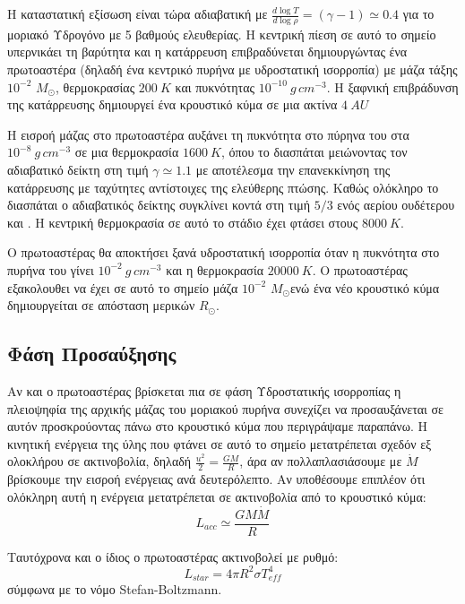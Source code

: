 \documentclass[a4paper,12pt]{memoir}
\newcommand{\sm}{$M_{\odot}$}
\begin{document}
Η καταστατική εξίσωση είναι τώρα αδιαβατική με $\frac{d \log T}{d \log \rho} = (\gamma-1) \simeq 0.4$ για το μοριακό Υδρογόνο με 5 βαθμούς ελευθερίας. Η κεντρική πίεση σε αυτό το σημείο υπερνικάει τη βαρύτητα και η κατάρρευση επιβραδύνεται δημιουργώντας ένα πρωτοαστέρα (δηλαδή ένα κεντρικό πυρήνα με υδροστατική ισορροπία) με μάζα τάξης $10^{-2}$ \sm, θερμοκρασίας $200 \ K$ και πυκνότητας $10^{-10} \ g \, cm^{-3}$.
Η ξαφνική επιβράδυνση της κατάρρευσης δημιουργεί ένα κρουστικό κύμα σε μια ακτίνα $4 \ AU$

Η εισροή μάζας στο πρωτοαστέρα αυξάνει τη πυκνότητα στο πύρηνα του στα $10^{-8} \ g \, cm^{-3}$ σε μια θερμοκρασία $1600 \ K$, όπου το  διασπάται μειώνοντας τον αδιαβατικό δείκτη στη τιμή $\gamma \simeq 1.1$ με αποτέλεσμα την επανεκκίνηση της κατάρρευσης με ταχύτητες αντίστοιχες της ελεύθερης πτώσης. Καθώς ολόκληρο το  διασπάται ο αδιαβατικός δείκτης συγκλίνει κοντά στη τιμή $5/3$ ενός αερίου ουδέτερου  και . Η κεντρική θερμοκρασία σε αυτό το στάδιο έχει φτάσει στους $8000 \ K$.

Ο πρωτοαστέρας θα αποκτήσει ξανά υδροστατική ισορροπία όταν η πυκνότητα στο πυρήνα του γίνει $10^{-2} \ g \, cm^{-3}$ και η θερμοκρασία $20000 \ K$. Ο πρωτοαστέρας εξακολουθει να έχει σε αυτό το σημείο μάζα $10^{-2}$ \sm ενώ ένα νέο κρουστικό κύμα δημιουργείται σε απόσταση μερικών $R_{\odot}$. 

\subsection{Φάση Προσαύξησης}
Αν και ο πρωτοαστέρας βρίσκεται πια σε φάση Υδροστατικής ισορροπίας η πλειοψηφία της αρχικής μάζας του μοριακού πυρήνα συνεχίζει να προσαυξάνεται σε αυτόν προσκρούοντας πάνω στο κρουστικό κύμα που περιγράψαμε παραπάνω. 
Η κινητική ενέργεια της ύλης που φτάνει σε αυτό το σημείο μετατρέπεται σχεδόν εξ ολοκλήρου σε ακτινοβολία, δηλαδή $\frac{u^2}{2}=\frac{GM}{R}$, άρα αν πολλαπλασιάσουμε με $\dot{M}$ βρίσκουμε την εισροή ενέργειας ανά δευτερόλεπτο. Αν υποθέσουμε επιπλέον ότι ολόκληρη αυτή η ενέργεια μετατρέπεται σε ακτινοβολία από το κρουστικό κύμα: 
\begin{equation}
L_{acc} \simeq \frac{GM\dot{M}}{R}
\end{equation}

Ταυτόχρονα και ο ίδιος ο πρωτοαστέρας ακτινοβολεί με ρυθμό:
\begin{equation}
L_{star}=4 \pi R^2 \sigma T_{eff} ^4
\end{equation}
σύμφωνα με το νόμο Stefan-Boltzmann.
\end{document}
